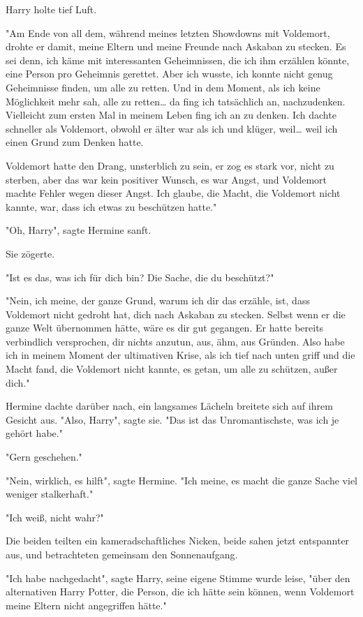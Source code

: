 {Harry holte tief Luft.

"Am Ende von all dem, während meines letzten Showdowns mit Voldemort, drohte er damit, meine Eltern und meine Freunde nach Askaban zu stecken. Es sei denn, ich käme mit interessanten Geheimnissen, die ich ihm erzählen könnte, eine Person pro Geheimnis gerettet. Aber ich wusste, ich konnte nicht genug Geheimnisse finden, um alle zu retten. Und in dem Moment, als ich keine Möglichkeit mehr sah, alle zu retten… da fing ich tatsächlich an, nachzudenken. Vielleicht zum ersten Mal in meinem Leben fing ich an zu denken. Ich dachte schneller als Voldemort, obwohl er älter war als ich und klüger, weil… weil ich einen Grund zum Denken hatte.

Voldemort hatte den Drang, unsterblich zu sein, er zog es stark vor, nicht zu sterben, aber das war kein positiver Wunsch, es war Angst, und Voldemort machte Fehler wegen dieser Angst. Ich glaube, die Macht, die Voldemort nicht kannte, war, dass ich etwas zu beschützen hatte."

"Oh, Harry", sagte Hermine sanft.

Sie zögerte.

"Ist es das, was ich für dich bin? Die Sache, die du beschützt?"

"Nein, ich meine, der ganze Grund, warum ich dir das erzähle, ist, dass Voldemort nicht gedroht hat, dich nach Askaban zu stecken. Selbst wenn er die ganze Welt übernommen hätte, wäre es dir gut gegangen. Er hatte bereits verbindlich versprochen, dir nichts anzutun, aus, ähm, aus Gründen. Also habe ich in meinem Moment der ultimativen Krise, als ich tief nach unten griff und die Macht fand, die Voldemort nicht kannte, es getan, um alle zu schützen, außer dich."

Hermine dachte darüber nach, ein langsames Lächeln breitete sich auf ihrem Gesicht aus. "Also, Harry", sagte sie. "Das ist das Unromantischste, was ich je gehört habe."

"Gern geschehen."

"Nein, wirklich, es hilft", sagte Hermine. "Ich meine, es macht die ganze Sache viel weniger stalkerhaft."

"Ich weiß, nicht wahr?"

Die beiden teilten ein kameradschaftliches Nicken, beide sahen jetzt entspannter aus, und betrachteten gemeinsam den Sonnenaufgang.

"Ich habe nachgedacht", sagte Harry, seine eigene Stimme wurde leise, "über den alternativen Harry Potter, die Person, die ich hätte sein können, wenn Voldemort meine Eltern nicht angegriffen hätte."

}
